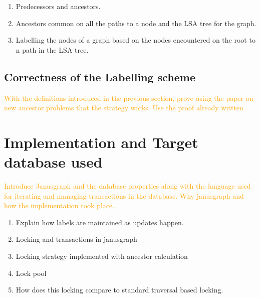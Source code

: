 \documentclass[sigconf, nonacm]{acmart}
\begin{document}
\begin{enumerate}
	\item Predecessors and ancestors.
	\item Ancestors common on all the paths to a node and the LSA tree for the graph.
	\item Labelling the nodes of a graph based on the nodes encountered on the root to n path in the LSA tree.
\end{enumerate}


\subsection{Correctness of the Labelling scheme}
\textcolor{orange}{With the definitions introduced in the previous section, prove using the paper on new ancestor problems that the strategy works. Use the proof already written}


\section{Implementation and Target database used}
\textcolor{orange}{Introduce Janusgraph and the database properties along with the language used for iterating and managing transactions in the database. Why janusgraph and how the implementation took place.}

\begin{enumerate}
	\item Explain how labels are maintained as updates happen.
	\item Locking and transactions in janusgraph
	\item Locking strategy implemented with ancestor calculation
	\item Lock pool
	\item How does this locking compare to standard traversal based locking.
\end{enumerate}
\end{document}
